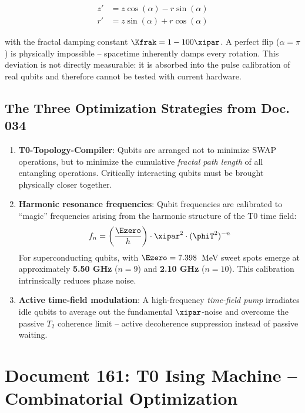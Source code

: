 \begin{align}
    z' &= z \cos(\alpha) - r \sin(\alpha) \\
    r' &= z \sin(\alpha) + r \cos(\alpha)
\end{align}

with the fractal damping constant $\Kfrak = 1 - 100\xipar$.
A perfect flip ($\alpha = \pi$) is physically impossible -- spacetime inherently
damps every rotation. This deviation is not directly measurable: it is absorbed into the pulse calibration of real qubits and therefore cannot be tested with current hardware.

\subsection{The Three Optimization Strategies from Doc. 034}

\begin{enumerate}
    \item \textbf{T0-Topology-Compiler}: Qubits are arranged not to minimize SWAP
    operations, but to minimize the cumulative \emph{fractal path length} of all
    entangling operations. Critically interacting qubits must be brought physically
    closer together.

    \item \textbf{Harmonic resonance frequencies}: Qubit frequencies are calibrated
    to ``magic'' frequencies arising from the harmonic structure of the T0 time field:
    \begin{equation}
        f_n = \left(\frac{\Ezero}{h}\right) \cdot \xipar^2 \cdot (\phiT^2)^{-n}
        \label{eq:harmonic_freq}
    \end{equation}
    For superconducting qubits, with $\Ezero = 7.398$~MeV sweet spots emerge at approximately \textbf{5.50 GHz}
    ($n=9$) and \textbf{2.10 GHz} ($n=10$). This calibration intrinsically reduces
    phase noise.

    \item \textbf{Active time-field modulation}: A high-frequency
    \emph{time-field pump} irradiates idle qubits to average out the fundamental
    $\xipar$-noise and overcome the passive $T_2$ coherence limit -- active
    decoherence suppression instead of passive waiting.
\end{enumerate}

\clearpage

\section{Document 161: T0 Ising Machine -- Combinatorial Optimization}
\label{sec:doc161}

